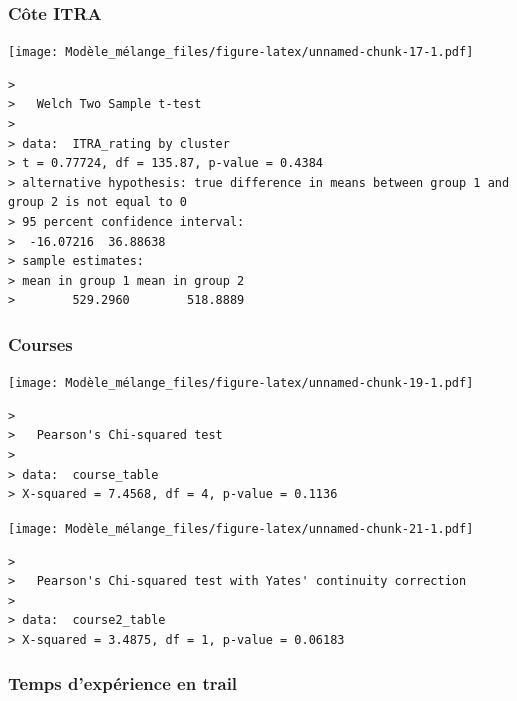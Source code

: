 \documentclass[
]{article}
\let\origfigure\figure
\let\endorigfigure\endfigure
\renewenvironment{figure}[1][2]{
    \expandafter\origfigure\expandafter[H]
} {
    \endorigfigure
}
\begin{document}
\hypertarget{cuxf4te-itra}{%
\subsubsection{Côte ITRA}\label{cuxf4te-itra}}

\begin{figure}
\centering
\texttt{[image: Modèle\_mélange\_files/figure-latex/unnamed-chunk-17-1.pdf]}
\caption{Répartition des côtes ITRA des coureurs par groupe}
\end{figure}

\begin{verbatim}
> 
>   Welch Two Sample t-test
> 
> data:  ITRA_rating by cluster
> t = 0.77724, df = 135.87, p-value = 0.4384
> alternative hypothesis: true difference in means between group 1 and group 2 is not equal to 0
> 95 percent confidence interval:
>  -16.07216  36.88638
> sample estimates:
> mean in group 1 mean in group 2 
>        529.2960        518.8889
\end{verbatim}

\hypertarget{courses}{%
\subsubsection{Courses}\label{courses}}

\begin{figure}
\centering
\texttt{[image: Modèle\_mélange\_files/figure-latex/unnamed-chunk-19-1.pdf]}
\caption{Répartition des courses par groupe}
\end{figure}

\begin{verbatim}
> 
>   Pearson's Chi-squared test
> 
> data:  course_table
> X-squared = 7.4568, df = 4, p-value = 0.1136
\end{verbatim}

\begin{figure}
\centering
\texttt{[image: Modèle\_mélange\_files/figure-latex/unnamed-chunk-21-1.pdf]}
\caption{Répartition des courses regroupées}
\end{figure}

\begin{verbatim}
> 
>   Pearson's Chi-squared test with Yates' continuity correction
> 
> data:  course2_table
> X-squared = 3.4875, df = 1, p-value = 0.06183
\end{verbatim}

\hypertarget{temps-dexpuxe9rience-en-trail}{%
\subsubsection{Temps d'expérience en
trail}\label{temps-dexpuxe9rience-en-trail}}
\end{document}
